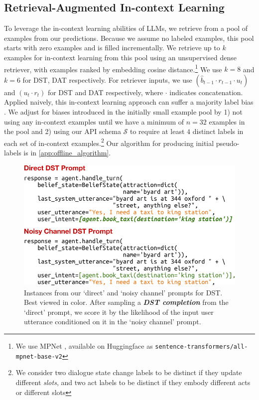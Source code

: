 \documentclass[11pt]{article}
\newcommand{\schema}[0]{\mathcal{S}}
\newcommand{\Pool}[0]{\mathcal{P}}
\newcommand{\concat}[0]{\cdot}
\newcommand{\dstcolor}[1]{\textcolor{dst-color}{#1}}
\newcommand{\coloruser}[1]{\textcolor{user-color}{#1}}  %
\begin{document}
\subsection{Retrieval-Augmented In-context Learning}
\label{sec:methods-retriever}
To leverage the in-context learning abilities of LLMs, we retrieve from a pool of examples from our predictions.
Because we assume no labeled examples, this pool starts with zero examples and is filled incrementally.
We retrieve up to $k$ examples for in-context learning from this pool using an unsupervised dense retriever, with examples ranked by embedding cosine distance.\footnote{We use MPNet \cite{song_mpnet_2020}, available on Huggingface as \texttt{sentence-transformers/all-mpnet-base-v2}} 
We use $k=8$ and $k=6$ for DST, DAT respectively. 
For retriever inputs, we use $(\hat{b}_{t-1} \concat r_{t-1} \concat u_t)$ and $(u_t \concat r_t)$ for DST and DAT respectively, where $\concat$ indicates concatenation.
Applied naively, this in-context learning approach can suffer a majority label bias \cite{pmlr-v139-zhao21c}. We adjust for biases introduced in the initially small example pool by 1) not using any in-context examples until we have a minimum of $n=32$ examples in the pool and 2) using our API schema $\schema$ to require at least $4$ distinct labels in each set of in-context examples.\footnote{We consider two dialogue state change labels to be distinct if they update different \textit{slots}, and two act labels to be distinct if they embody different acts or different slots}
Our algorithm for producing initial pseudo-labels is in \autoref{app:offline_algorithm}.
\begin{figure}
    \centering
    \includegraphics[width=\columnwidth]{imgs/fig_direct_vs_channel_dst_v2.pdf}
    \caption{Instances from our `direct' and `noisy channel' prompts for DST. Best viewed in color. After sampling a \dstcolor{\textbf{\textit{DST completion}}} from the `direct' prompt, we score it by the likelihood of the input \coloruser{user utterance} conditioned on it in the `noisy channel' prompt.} 
    \label{fig:compare-direct-channel-dst}
\end{figure}
\end{document}
